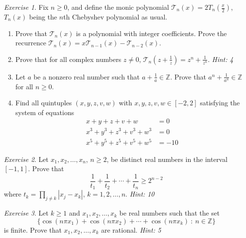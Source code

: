 \documentclass{article}
\theoremstyle{definition}
\theoremstyle{remark}
\newtheorem{exercise}{Exercise}
\newcommand{\ZZ}{\mathbb{Z}}
\newcommand{\mcT}{\mathcal{T}}
\newcommand{\geqs}{\geqslant}
\begin{document}
\begin{exercise}
Fix $n\geqs 0$, and define the monic polynomial $\mcT_n(x)=2T_n(\frac{x}{2})$, $T_n(x)$ being the $n$th Chebyshev polynomial as usual.
\begin{enumerate}[label=(\alph*)]
    \item Prove that $\mcT_n(x)$ is a polynomial with integer coefficients. Prove the recurrence $\mcT_n(x)=x\mcT_{n-1}(x)- \mcT_{n-2}(x)$.
    \item Prove that for all complex numbers $z\neq 0$, $\mcT_n\left(z+\frac{1}{z}\right) = z^n+\frac{1}{z^n}$. \emph{Hint: 4}
    \item Let $a$ be a nonzero real number such that $a+\frac{1}{a}\in \ZZ$. Prove that $a^n+\frac{1}{a^n}\in \ZZ$ for all $n\geqs 0$.
    \item Find all quintuples $(x,y,z,v,w)$ with $x,y,z,v,w\in [-2,2]$ satisfying the system of equations
    \begin{align*}
        x+y+z+v+w&=0 \\
        x^3+y^3+z^3+v^3+w^3 &= 0 \\
        x^5 + y^5+z^5+v^5+w^5 &= -10
    \end{align*}
\end{enumerate}
\end{exercise}
\begin{exercise}
Let $x_1,x_2,\dots,x_n$, $n\geqs 2$, be distinct real numbers in the interval $[-1,1]$. Prove that 
\[\frac{1}{t_1}+\frac{1}{t_2}+\cdots+\frac{1}{t_n}\geqs 2^{n-2}\] where $t_k = \prod_{j\neq k} |x_j-x_k|$, $k=1,2,\dots,n$. \emph{Hint: 10}
\end{exercise} 

\begin{exercise}
Let $k\geqs 1$ and $x_1,x_2,\dots,x_k$ be real numbers such that the set
\[\{\cos(n\pi x_1)+\cos(n\pi x_2)+\cdots + \cos (n\pi x_k)\ :\ n\in \ZZ\}\] is finite. Prove that $x_1,x_2,\dots,x_k$ are rational. \emph{Hint: 5}
\end{exercise}
\end{document}
